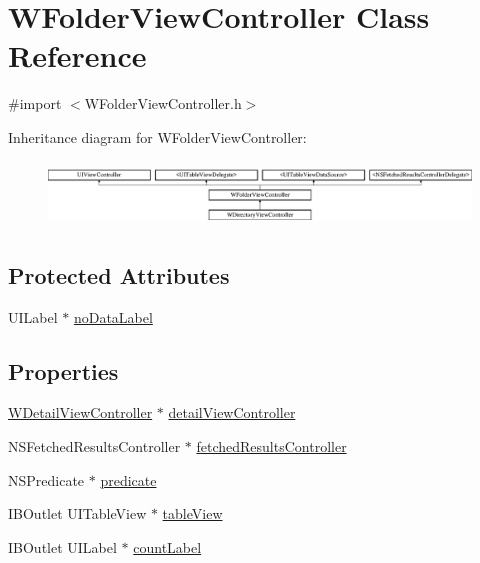 \hypertarget{interface_w_folder_view_controller}{\section{W\-Folder\-View\-Controller Class Reference}
\label{interface_w_folder_view_controller}
}


{\ttfamily \#import $<$W\-Folder\-View\-Controller.\-h$>$}

Inheritance diagram for W\-Folder\-View\-Controller\-:\begin{figure}[H]
\begin{center}
\leavevmode
\includegraphics[height=1.728395cm]{interface_w_folder_view_controller}
\end{center}
\end{figure}
\subsection*{Protected Attributes}
\begin{DoxyCompactItemize}
\item 
U\-I\-Label $\ast$ \hyperlink{interface_w_folder_view_controller_a48a9972a0bb5a46bbc214d87cb8f7df3}{no\-Data\-Label}
\end{DoxyCompactItemize}
\subsection*{Properties}
\begin{DoxyCompactItemize}
\item 
\hyperlink{interface_w_detail_view_controller}{W\-Detail\-View\-Controller} $\ast$ \hyperlink{interface_w_folder_view_controller_aa76befca9071761b18d48ed96db44d56}{detail\-View\-Controller}
\item 
N\-S\-Fetched\-Results\-Controller $\ast$ \hyperlink{interface_w_folder_view_controller_af8097e4bcc92e10d91dedc760123a66a}{fetched\-Results\-Controller}
\item 
N\-S\-Predicate $\ast$ \hyperlink{interface_w_folder_view_controller_aa3930e85f96ce1dd94f95cb3f78d529f}{predicate}
\item 
I\-B\-Outlet U\-I\-Table\-View $\ast$ \hyperlink{interface_w_folder_view_controller_a0f087f9ecbef58dabd499627304e1e75}{table\-View}
\item 
I\-B\-Outlet U\-I\-Label $\ast$ \hyperlink{interface_w_folder_view_controller_af1b6f86c12c154650c6c2390bbd59f22}{count\-Label}
\end{DoxyCompactItemize}


